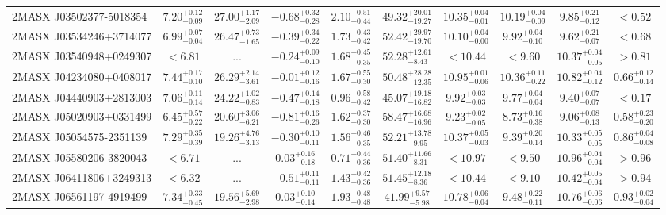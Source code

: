 \documentclass[onecolumn]{mn2e}
\begin{document}
\begin{landscape}
{\begin{center}
\begin{longtable}{lccccccccc}
2MASX J03502377-5018354 & $7.20_{-0.09}^{+0.12}$ & $27.00_{-2.09}^{+1.17}$ & $-0.68_{-0.28}^{+0.32}$ & $2.10_{-0.44}^{+0.51}$ &$49.32_{-19.27}^{+20.01}$ & $10.35_{-0.01}^{+0.04}$ & $10.19_{-0.09}^{+0.04}$ & $9.85_{-0.12}^{+0.21}$ & $<0.52$ \\
2MASX J03534246+3714077 & $6.99_{-0.04}^{+0.07}$ & $26.47_{-1.65}^{+0.73}$ & $-0.39_{-0.22}^{+0.34}$ & $1.73_{-0.42}^{+0.43}$ &$52.42_{-19.70}^{+29.97}$ & $10.10_{-0.00}^{+0.04}$ & $9.92_{-0.10}^{+0.04}$ & $9.62_{-0.07}^{+0.21}$ & $<0.68$ \\
2MASX J03540948+0249307 & $<6.81$ & ... & $-0.24_{-0.10}^{+0.09}$ & $1.68_{-0.35}^{+0.45}$ &$52.28_{-8.43}^{+12.61}$ & $<10.44$ & $<9.60$ & $10.37_{-0.05}^{+0.04}$ & $>0.81$ \\
2MASX J04234080+0408017 & $7.44_{-0.10}^{+0.17}$ & $26.29_{-3.61}^{+2.14}$ & $-0.01_{-0.16}^{+0.12}$ & $1.67_{-0.30}^{+0.55}$ &$50.48_{-12.35}^{+28.28}$ & $10.95_{-0.06}^{+0.01}$ & $10.36_{-0.22}^{+0.11}$ & $10.82_{-0.12}^{+0.04}$ & $0.66_{-0.14}^{+0.12}$ \\
2MASX J04440903+2813003 & $7.06_{-0.14}^{+0.11}$ & $24.22_{-0.83}^{+1.02}$ & $-0.47_{-0.18}^{+0.14}$ & $0.96_{-0.42}^{+0.58}$ &$45.07_{-16.82}^{+19.18}$ & $9.92_{-0.03}^{+0.03}$ & $9.77_{-0.04}^{+0.04}$ & $9.40_{-0.07}^{+0.07}$ & $<0.17$ \\
2MASX J05020903+0331499 & $6.45_{-0.22}^{+0.57}$ & $20.60_{-6.21}^{+3.06}$ & $-0.81_{-0.26}^{+0.16}$ & $1.62_{-0.30}^{+0.37}$ &$58.47_{-16.96}^{+16.68}$ & $9.23_{-0.05}^{+0.02}$ & $8.73_{-0.38}^{+0.16}$ & $9.06_{-0.13}^{+0.08}$ & $0.58_{-0.20}^{+0.23}$ \\
2MASX J05054575-2351139 & $7.29_{-0.39}^{+0.35}$ & $19.26_{-3.13}^{+4.76}$ & $-0.30_{-0.11}^{+0.10}$ & $1.56_{-0.35}^{+0.46}$ &$52.21_{-9.95}^{+13.78}$ & $10.37_{-0.03}^{+0.05}$ & $9.39_{-0.14}^{+0.20}$ & $10.33_{-0.05}^{+0.05}$ & $0.86_{-0.08}^{+0.04}$ \\
2MASX J05580206-3820043 & $<6.71$ & ... & $0.03_{-0.18}^{+0.16}$ & $0.71_{-0.36}^{+0.44}$ &$51.40_{-8.31}^{+11.66}$ & $<10.97$ & $<9.50$ & $10.96_{-0.04}^{+0.04}$ & $>0.96$ \\
2MASX J06411806+3249313 & $<6.32$ & ... & $-0.51_{-0.11}^{+0.11}$ & $1.43_{-0.36}^{+0.42}$ &$51.45_{-8.36}^{+12.18}$ & $<10.44$ & $<9.10$ & $10.42_{-0.04}^{+0.05}$ & $>0.94$ \\
2MASX J06561197-4919499 & $7.34_{-0.45}^{+0.33}$ & $19.56_{-2.98}^{+5.69}$ & $0.03_{-0.14}^{+0.10}$ & $1.93_{-0.48}^{+0.48}$ &$41.99_{-5.98}^{+9.57}$ & $10.78_{-0.04}^{+0.06}$ & $9.48_{-0.11}^{+0.22}$ & $10.76_{-0.06}^{+0.06}$ & $0.93_{-0.04}^{+0.02}$ \\

\end{longtable}
\end{center}}
\end{landscape}
\end{document}
